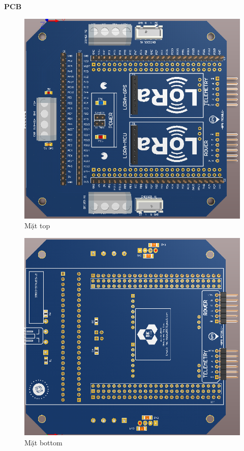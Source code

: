 \documentclass[a4paper, 12pt]{article}
\begin{document}
	\newpage
	\textbf{PCB}
		\begin{center}
		\begin{figure}[H]
			\begin{center}
				\includegraphics[scale=.5]{images/topboard.png}
			\end{center}
			\caption{Mặt top}
			\label{refhinh1}
		\end{figure}
	\end{center}
	

	\begin{center}
		\begin{figure}[H]
			\begin{center}
				\includegraphics[scale=.5]{images/botboard.png}
			\end{center}
			\caption{Mặt bottom}
			\label{refhinh1}
		\end{figure}
	\end{center}
\end{document}
